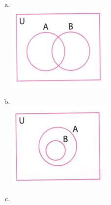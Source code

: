 \documentclass[a4paper,14pt]{article}
\begin{document}
\begin{multicols}{2}
\begin{enumerate}
\begin{enumerate}[a)]
   				\item ~ \\ \includegraphics[width=1\linewidth]{6FMA73_imagens/imagem06}
   				\item ~ \\
   				\includegraphics[width=1\linewidth]{6FMA73_imagens/imagem07} \newpage
   				\item ~ \\

\end{enumerate}
\end{enumerate}
\end{multicols}
\end{document}
